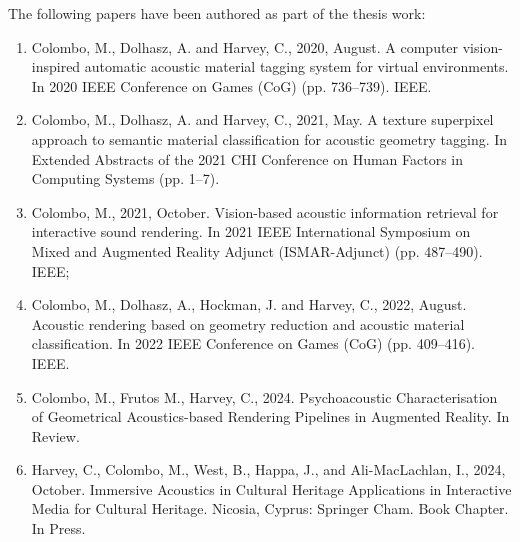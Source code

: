 The following papers have been authored as part of the thesis work:

\begin{enumerate}
    \item Colombo, M., Dolhasz, A. and Harvey, C., 2020, August. A computer vision-inspired automatic acoustic material tagging system for virtual environments. In 2020 IEEE Conference on Games (CoG) (pp. 736--739). IEEE.
    \item Colombo, M., Dolhasz, A. and Harvey, C., 2021, May. A texture superpixel approach to semantic material classification for acoustic geometry tagging. In Extended Abstracts of the 2021 CHI Conference on Human Factors in Computing Systems (pp. 1--7).
    \item Colombo, M., 2021, October. Vision-based acoustic information retrieval for interactive sound rendering. In 2021 IEEE International Symposium on Mixed and Augmented Reality Adjunct (ISMAR-Adjunct) (pp. 487--490). IEEE;
    \item Colombo, M., Dolhasz, A., Hockman, J. and Harvey, C., 2022, August. Acoustic rendering based on geometry reduction and acoustic material classification. In 2022 IEEE Conference on Games (CoG) (pp. 409--416). IEEE.
    \item Colombo, M., Frutos M., Harvey, C., 2024. Psychoacoustic Characterisation of Geometrical Acoustics-based Rendering Pipelines in Augmented Reality. In Review.
    \item Harvey, C., Colombo, M., West, B., Happa, J., and Ali-MacLachlan, I., 2024, October. Immersive Acoustics in Cultural Heritage Applications in Interactive Media for Cultural Heritage. Nicosia, Cyprus: Springer Cham. Book Chapter. In Press.
\end{enumerate}



